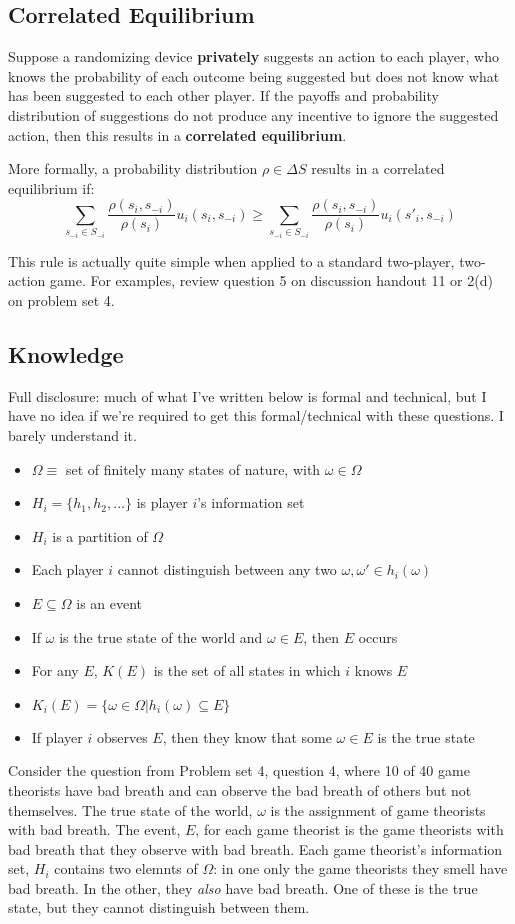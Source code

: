 \documentclass{article}
\newcommand{\red}[1]{{\color{red}#1}}
\begin{document}
\subsection{Correlated Equilibrium}
Suppose a randomizing device \textbf{privately} suggests an action to each player, who knows the probability of each outcome being suggested but does not know what has been suggested to each other player. If the payoffs and probability distribution of suggestions do not produce any incentive to ignore the suggested action, then this results in a \textbf{correlated equilibrium}.

More formally, a probability distribution ${\rho\in\Delta S}$ results in a correlated equilibrium if:
\[
	\sum_{s_{-i}\in S_{-i}}\frac{\rho(s_i,s_{-i})}{\rho(s_i)}u_i(s_i,s_{-i})\geq \sum_{s_{-i}\in S_{-i}}\frac{\rho(s_i,s_{-i})}{\rho(s_i)}u_i(s'_i,s_{-i})
\]

This rule is actually quite simple when applied to a standard two-player, two-action game. For examples, review \red{question 5 on discussion handout 11} or \red{2(d) on problem set 4}.

\subsection{Knowledge}
Full disclosure: much of what I've written below is formal and technical, but I have no idea if we're required to get this formal/technical with these questions. I barely understand it. 
\begin{itemize}
	\item $\Omega \equiv$ set of finitely many states of nature, with $\omega\in\Omega$ 
	\item ${H_i=\{h_1,h_2,...\}}$ is player $i$'s information set 
	\item $H_i$ is a partition of $\Omega$
	\item Each player $i$ cannot distinguish between any two ${\omega,\omega'\in h_i(\omega)}$
	\item ${E\subseteq\Omega}$ is an event
	\item If $\omega$ is the true state of the world and ${\omega\in E}$, then $E$ occurs
	\item For any $E$, $K(E)$ is the set of all states in which $i$ knows $E$ 
	\item $K_i(E) = \{\omega\in\Omega|h_i(\omega)\subseteq E\}$
	\item If player $i$ observes $E$, then they know that some $\omega\in E$ is the true state
\end{itemize}
Consider the question from \red{Problem set 4, question 4}, where 10 of 40 game theorists have bad breath and can observe the bad breath of others but not themselves. The true state of the world, $\omega$ is the assignment of game theorists with bad breath. The event, $E$, for each game theorist is the game theorists with bad breath that they observe with bad breath. Each game theorist's information set, $H_i$ contains two elemnts of $\Omega$: in one only the game theorists they smell have bad breath. In the other, they \textit{also} have bad breath. One of these is the true state, but they cannot distinguish between them.
\end{document}
